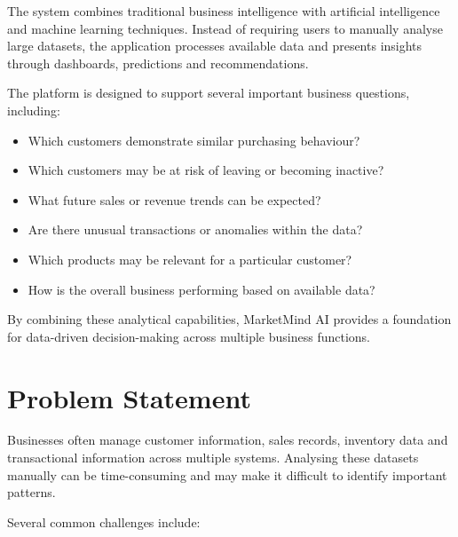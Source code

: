 \documentclass[12pt,a4paper]{report}
\begin{document}
The system combines traditional business intelligence with artificial
intelligence and machine learning techniques. Instead of requiring users
to manually analyse large datasets, the application processes available
data and presents insights through dashboards, predictions and
recommendations.

The platform is designed to support several important business questions,
including:

\begin{itemize}[leftmargin=1.2cm]

\item Which customers demonstrate similar purchasing behaviour?

\item Which customers may be at risk of leaving or becoming inactive?

\item What future sales or revenue trends can be expected?

\item Are there unusual transactions or anomalies within the data?

\item Which products may be relevant for a particular customer?

\item How is the overall business performing based on available data?

\end{itemize}

By combining these analytical capabilities, MarketMind AI provides a
foundation for data-driven decision-making across multiple business
functions.



\section{Problem Statement}

Businesses often manage customer information, sales records, inventory
data and transactional information across multiple systems. Analysing
these datasets manually can be time-consuming and may make it difficult
to identify important patterns.

Several common challenges include:
\end{document}

